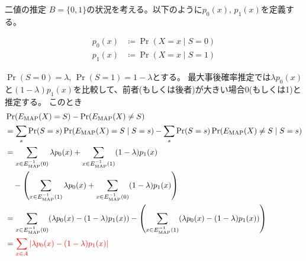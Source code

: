 \documentclass[lualatex,handout]{beamer}
\newcommand{\mycolor}[2]{%
  \begingroup
  \colorlet{currentcolor}{.}%
  \color{#1}#2%
  \color{currentcolor}%
  \endgroup
}
\newcommand{\emm}[1]{\mycolor{red}{#1}}
\theoremstyle{definition}
\begin{document}
\begin{frame}{二値の推定}
\footnotesize
$B = \{0,1\}$の状況を考える。以下のように$p_0(x),\,p_1(x)$を定義する。

\begin{align*}
p_0(x) &\coloneq \Pr(X=x\mid S=0)\\
p_1(x) &\coloneq \Pr(X=x\mid S=1)
\end{align*}

\vspace{.5em}
$\Pr(S=0)=\lambda$, $\Pr(S=1)=1-\lambda$とする。
最大事後確率推定では$\lambda p_0(x)$と$(1-\lambda)p_1(x)$を比較して、前者(もしくは後者)が大きい場合0(もしくは1)と推定する。
このとき
\begin{align*}
&\Pr(E_{\mathrm{MAP}}(X) = S) - \Pr(E_{\mathrm{MAP}}(X)\ne S)\\
&= \sum_s \Pr(S=s) \Pr(E_{\mathrm{MAP}}(X) = S\mid S = s)
- \sum_s \Pr(S=s) \Pr(E_{\mathrm{MAP}}(X) \ne S\mid S = s)\\
&=\sum_{x\in E_{\mathrm{MAP}}^{-1}(0)} \lambda p_0(x) + \sum_{x\in E_{\mathrm{MAP}}^{-1}(1)} (1-\lambda)p_1(x)\\
&\quad -\left(\sum_{x\in E_{\mathrm{MAP}}^{-1}(1)} \lambda p_0(x) + \sum_{x\in E_{\mathrm{MAP}}^{-1}(0)} (1-\lambda)p_1(x)\right)\\
&=\sum_{x\in E_{\mathrm{MAP}}^{-1}(0)} (\lambda p_0(x) - (1-\lambda)p_1(x))
-\left(\sum_{x\in E_{\mathrm{MAP}}^{-1}(1)} (\lambda p_0(x) - (1-\lambda)p_1(x))\right)\\
&=\emm{\sum_{x\in A} \left|\lambda p_0(x) - (1-\lambda)p_1(x)\right|}
\end{align*}
\end{frame}

\end{document}
